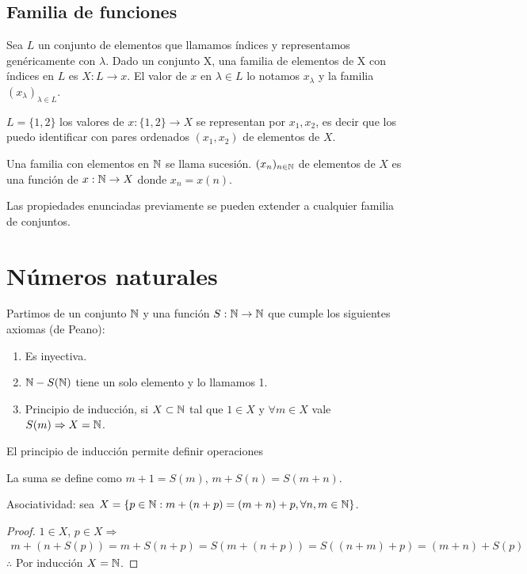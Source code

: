 \subsection{Familia de funciones}

Sea \(L\) un conjunto de elementos que llamamos índices y representamos genéricamente con \(\lambda\). Dado un conjunto X, una familia de elementos de X con índices en \(L\) es \(X: L \to x\).
El valor de \(x\) en \(\lambda \in L\) lo notamos \(x_\lambda\) y la familia \((x_\lambda)_{\lambda \in L}\).

\begin{eg}
    \(L = \{ 1, 2 \}\) los valores de \(x: \{1, 2\} \to X\) se representan por \(x_1, x_2\), es decir que los puedo identificar con pares ordenados \((x_1, x_2)\) de elementos de \(X\).
\end{eg}

Una familia con elementos en \(\mathbb{N}\) se llama sucesión. \((x_n)_{n \in \mathbb{N}}\) de elementos de \(X\) es una función de \(x: \mathbb{N} \to X\) donde \(x_n = x(n)\).

Las propiedades enunciadas previamente se pueden extender a cualquier familia de conjuntos.

\section{Números naturales}

Partimos de un conjunto \(\mathbb{N}\) y una función \(S: \mathbb{N} \to \mathbb{N}\) que cumple los siguientes axiomas (de Peano):
\begin{enumerate}
    \item Es inyectiva.
    \item \(\mathbb{N} - S(\mathbb{N})\) tiene un solo elemento y lo llamamos 1.
    \item Principio de inducción, si \(X \subset \mathbb{N}\) tal que \(1 \in X\) y \(\forall m \in X\) vale \(S(m) \Rightarrow X = \mathbb{N}\).
\end{enumerate}

El principio de inducción permite definir operaciones

La suma se define como \(m+1 = S(m)\), \(m+S(n) = S(m+n)\).

\begin{prop}
    Asociatividad: sea \(X = \{ p \in \mathbb{N} : m+(n+p) = (m+n) +p, \forall n,m \in \mathbb{N} \}\).
    \begin{proof}
        \(1 \in X\), \(p \in X \Rightarrow\) \begin{align*}
            m + (n+S(p)) = m + S(n+p) = S(m +(n+p)) = S((n+m)+p) = (m+n) + S(p)
        \end{align*}
        \(\therefore\) Por inducción \(X = \mathbb{N}\).
    \end{proof}
\end{prop}


